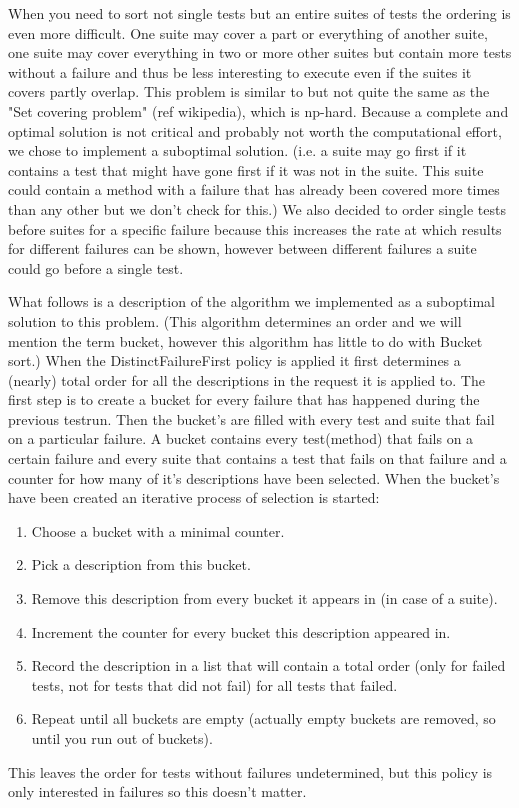 \documentclass[i2]{oss}
\begin{document}
When you need to sort not single tests but an entire suites of tests the 
ordering is even more difficult.
One suite may cover a part or everything of another suite, one suite 
may cover everything in two or more other suites but contain more tests 
without a failure and thus be less interesting to execute even if the 
suites it covers partly overlap.
This problem is similar to but not quite the same as the
"Set covering problem" (ref wikipedia), which is np-hard.
Because a complete and optimal solution is not critical and probably 
not worth the computational effort, we chose to implement a suboptimal 
solution. (i.e. a suite may go first if it contains a test that might 
have gone first if it was not in the suite. This suite could contain a 
method with a failure that has already been covered more times than any 
other but we don't check for this.)
We also decided to order single tests before suites for a specific 
failure because this increases the rate at which results for different 
failures can be shown, however between different failures a suite could 
go before a single test.


What follows is a description of the algorithm we implemented as a 
suboptimal solution to this problem.
(This algorithm determines an order and we will mention the term bucket,
however this algorithm has little to do with Bucket sort.)
When the DistinctFailureFirst policy is applied it first determines a 
(nearly) total order for all the descriptions in the request it is 
applied to.
The first step is to create a bucket for every failure that has 
happened during the previous testrun.
Then the bucket's are filled with every test and suite that fail on a 
particular failure.
A bucket contains every test(method) that fails on a certain failure 
and every suite that contains a test that fails on that failure and a 
counter for how many of it's descriptions have been selected.
When the bucket's have been created an iterative process of selection is
started:
\begin{enumerate}
	\item Choose a bucket with a minimal counter.
	\item Pick a description from this bucket.
	\item Remove this description from every bucket it appears in
    		(in case of a suite).
	\item Increment the counter for every bucket this description
    		appeared in.
	\item Record the description in a list that will contain a total 
    		order
            (only for failed tests, not for tests that did not fail)
			for all tests that failed.
	\item Repeat until all buckets are empty (actually empty buckets 
    		are removed, so until you run out of buckets).
\end{enumerate}
This leaves the order for tests without failures undetermined, but this policy is only interested in failures so this doesn't matter.
            
\end{document}
